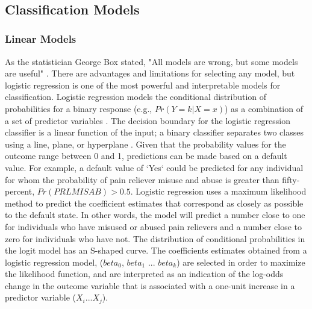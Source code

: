 \\\documentclass[sigconf]{acmart}
\begin{document}

\subsection{Classification Models}

\subsubsection{Linear Models}

As the statistician George Box stated, "All models are wrong, but some models 
are useful" \cite{box05}. There are advantages and limitations for selecting
any model, but logistic regression is one of the most powerful and interpretable 
models for classification. Logistic regression models the conditional 
distribution of probabilities for a binary response (e.g., $Pr(Y=k | X=x)$) 
as a combination of a set of predictor variables \cite{james13, raschka17}. 
The decision boundary for the logistic regression classifier is a linear 
function of the input; a binary classifier separates two classes using a line, 
plane, or hyperplane \cite{muller17}. Given that the probability values for 
the outcome range between 0 and 1, predictions can be made based on a default 
value. For example, a default value of `Yes` could be predicted for any 
individual for whom the probability of pain reliever misuse and abuse is 
greater than fifty-percent, $Pr(PRLMISAB) > 0.5$. Logistic regression uses 
a maximum likelihood method to predict the coefficient estimates that 
correspond as closely as possible to the default state. In other words, the 
model will predict a number close to one for individuals who have misused or 
abused pain relievers and a number close to zero for individuals who have 
not. The distribution of conditional probabilities in the logit model has an 
S-shaped curve. The coefficients estimates obtained from a logistic regression 
model, ($beta_0$, $beta_1$ ... $beta_k$) are selected in order to maximize the 
likelihood function, and are interpreted as an indication of the log-odds 
change in the outcome variable that is associated with a one-unit increase 
in a predictor variable ($X_i$...$X_j$). 

\end{document}
